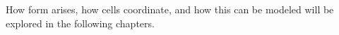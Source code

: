 How form arises, how cells coordinate, and how this can be modeled will be explored in the following chapters.































